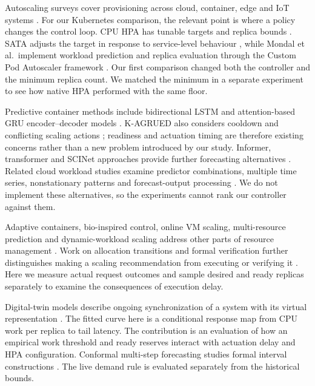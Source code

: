 \documentclass[10pt,twocolumn,a4paper]{article}
\begin{document}
Autoscaling surveys cover provisioning across cloud, container, edge and IoT systems \cite{j06,j08,j09,j24,j26}. For our Kubernetes comparison, the relevant point is where a policy changes the control loop. CPU HPA has tunable targets and replica bounds \cite{j01,j02}. SATA adjusts the target in response to service-level behaviour \cite{j04}, while Mondal et al.\ implement workload prediction and replica evaluation through the Custom Pod Autoscaler framework \cite{j03}. Our first comparison changed both the controller and the minimum replica count. We matched the minimum in a separate experiment to see how native HPA performed with the same floor.

Predictive container methods include bidirectional LSTM and attention-based GRU encoder--decoder models \cite{j18,j05}. K-AGRUED also considers cooldown and conflicting scaling actions \cite{j05}; readiness and actuation timing are therefore existing concerns rather than a new problem introduced by our study. Informer, transformer and SCINet approaches provide further forecasting alternatives \cite{j13,j15,j25}. Related cloud workload studies examine predictor combinations, multiple time series, nonstationary patterns and forecast-output processing \cite{j16,j22,j23,j29}. We do not implement these alternatives, so the experiments cannot rank our controller against them.

Adaptive containers, bio-inspired control, online VM scaling, multi-resource prediction and dynamic-workload scaling address other parts of resource management \cite{j07,j10,j11,j14,j17}. Work on allocation transitions and formal verification further distinguishes making a scaling recommendation from executing or verifying it \cite{j12,j27}. Here we measure actual request outcomes and sample desired and ready replicas separately to examine the consequences of execution delay.

Digital-twin models describe ongoing synchronization of a system with its virtual representation \cite{j19,j28}. The fitted curve here is a conditional response map from CPU work per replica to tail latency. The contribution is an evaluation of how an empirical work threshold and ready reserves interact with actuation delay and HPA configuration. Conformal multi-step forecasting studies formal interval constructions \cite{j20,j21}. The live demand rule is evaluated separately from the historical bounds.
\end{document}
